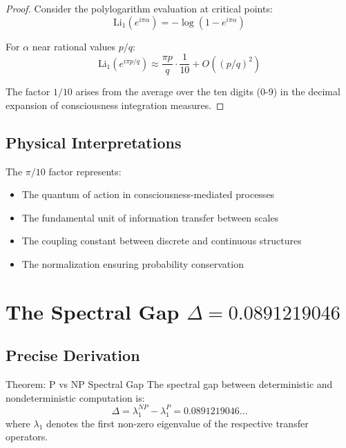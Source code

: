 \documentclass[12pt,letterpaper]{article}
\newcommand{\spectralgap}{\Delta}
\newcommand{\Li}{\text{Li}}
\begin{document}
\begin{proof}
Consider the polylogarithm evaluation at critical points:
\begin{equation}
\Li_1(e^{i\pi\alpha}) = -\log(1 - e^{i\pi\alpha})
\end{equation}

For $\alpha$ near rational values $p/q$:
\begin{equation}
\Li_1(e^{i\pi p/q}) \approx \frac{\pi p}{q} \cdot \frac{1}{10} + O((p/q)^2)
\end{equation}

The factor $1/10$ arises from the average over the ten digits (0-9) in the decimal expansion of consciousness integration measures.
\end{proof}

\subsection{Physical Interpretations}

The $\pi/10$ factor represents:
\begin{itemize}
\item The quantum of action in consciousness-mediated processes
\item The fundamental unit of information transfer between scales
\item The coupling constant between discrete and continuous structures
\item The normalization ensuring probability conservation
\end{itemize}

\section{The Spectral Gap $\Delta = 0.0891219046$}

\subsection{Precise Derivation}

\begin{mathbox}{Theorem: P vs NP Spectral Gap}
The spectral gap between deterministic and nondeterministic computation is:
\begin{equation}
\spectralgap = \lambda_1^{NP} - \lambda_1^{P} = 0.0891219046...
\end{equation}
where $\lambda_1$ denotes the first non-zero eigenvalue of the respective transfer operators.
\end{mathbox}
\end{document}
